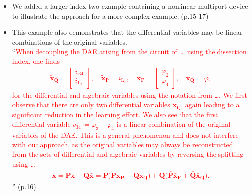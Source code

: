 \documentclass[a4paper, 10pt,
    ]{article}
\newcommand{\mb}[1]{\mathbf{#1}}
\newcommand{\mbt}[1]{\tilde{\mathbf{#1}}}
\newcommand{\mbb}[1]{\bar{\mathbf{#1}}}
\newcommand{\mr}[1]{\mathrm{#1}}
\begin{document}
\begin{itemize}
\begin{itemize}
            \item We added a larger index two example containing a nonlinear multiport device to illustrate the approach for a more complex example. (p.15-17)
            \item This example also demonstrates that the differential variables may be linear combinations of the original variables.\\
            ``\textcolor{red}{When decoupling the DAE arising from the circuit of \dots\ using the dissection index, one finds
            \begin{align*}
                \mbt{x}_\mb{Q} = \begin{bmatrix}
                    v_{34}\\
                    i_{\mr{L}_2}
                \end{bmatrix}, \quad \mbt{x}_\mb{P} = i_{\mr{L}_1}, \quad \mbb{x}_\mb{P} = \begin{bmatrix}
                    \varphi_2\\
                    \varphi_4
                \end{bmatrix}, \quad \mbb{x}_\mb{Q} = \varphi_1
            \end{align*}
            for the differential and algebraic variables using the notation from \dots. We first observe that there are only two differential variables $\mbt{x}_\mb{Q}$, again leading to a significant reduction in the learning effort. We also see that the first differential variable $v_{34} \coloneqq \varphi_3 - \varphi_4$ is a linear combination of the original variables of the DAE. This is a general phenomenon and does not interfere with our approach, as the original variables may always be reconstructed from the sets of differential and algebraic variables by reversing the splitting using \dots
            \begin{align*}
                \mb{x} = \mb{P} \mbt{x} + \mb{Q} \mbb{x} = \mb{P} \big( \mbt{P} \mbt{x}_\mb{P} + \mbt{Q} \mbt{x}_\mb{Q} \big) + \mb{Q} \big( \mbb{P} \mbb{x}_\mb{P} + \mbb{Q} \mbb{x}_\mb{Q} \big).
            \end{align*}}'' (p.16)
        \end{itemize}


\end{itemize}
\end{document}

